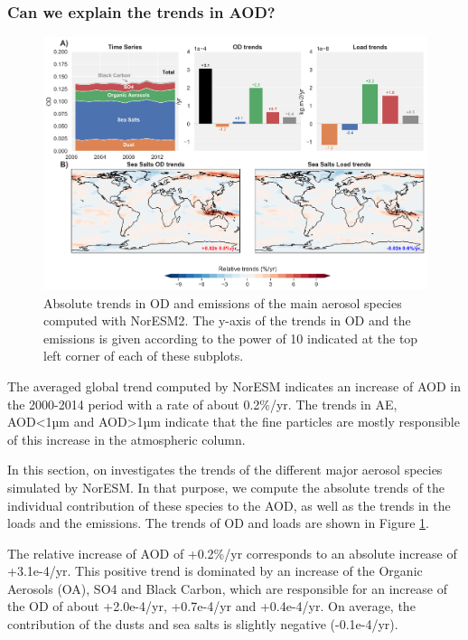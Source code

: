 \documentclass[journal abbreviation, manuscript]{copernicus}
\begin{document}
\subsubsection{Can we explain the trends in AOD?}

\begin{figure}[t]
 \includegraphics[width=16cm]{../scripts/figs/pannel-abs_species_trends.png}
 \caption{Absolute trends in OD and emissions of the main aerosol species computed with NorESM2. The y-axis of the trends in OD and the emissions is given according to the power of 10 indicated at the top left corner of each of these subplots.}
 \label{fig:species}
\end{figure}

The averaged global trend computed by NorESM indicates an increase of AOD in the 2000-2014 period with a rate of about 0.2\%/yr. The trends in AE, AOD<1µm and AOD>1µm indicate that the fine particles are mostly responsible of this increase in the atmospheric column.

In this section, on investigates the trends of the different major aerosol species simulated by NorESM. In that purpose, we compute the absolute trends of the individual contribution of these species to the AOD, as well as the trends in the loads and the emissions. The trends of OD and loads are shown in Figure \ref{fig:species}.

The relative increase of AOD of +0.2\%/yr corresponds to an absolute increase of +3.1e-4/yr. This positive trend is dominated by an increase of the Organic Aerosols (OA), SO4 and Black Carbon, which are responsible for an increase of the OD of about +2.0e-4/yr, +0.7e-4/yr and +0.4e-4/yr. On average, the contribution of the dusts and sea salts is slightly negative (-0.1e-4/yr).
\end{document}
